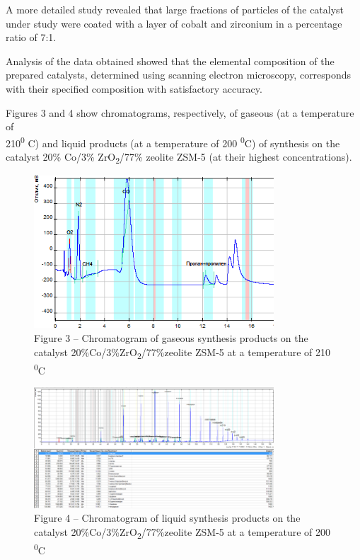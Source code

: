 \begin{multicols}{2}
A more detailed study revealed that large fractions of particles of the
catalyst under study were coated with a layer of cobalt and zirconium in
a percentage ratio of 7:1.

Analysis of the data obtained showed that the elemental composition of
the prepared catalysts, determined using scanning electron microscopy,
corresponds with their specified composition with satisfactory accuracy.

Figures 3 and 4 show chromatograms, respectively, of gaseous (at a
temperature of\\
210\textsuperscript{0} C) and liquid products (at a temperature of 200
\textsuperscript{0}C) of synthesis on the catalyst 20\% Co/3\%
ZrO\textsubscript{2}/77\% zeolite ZSM-5 (at their highest
concentrations).
\end{multicols}

\begin{figure}[H]
	\centering
	\includegraphics[width=0.8\textwidth]{assets/1079}
	\caption*{Figure 3 -- Chromatogram of gaseous synthesis products on the catalyst 20\%Co/3\%ZrO\textsubscript{2}/77\%zeolite ZSM-5 at a temperature of 210 \textsuperscript{0}C}
\end{figure}

\begin{figure}[H]
	\centering
	\includegraphics[width=0.8\textwidth]{assets/1080}
	\caption*{Figure 4 -- Chromatogram of liquid synthesis products on the catalyst 20\%Co/3\%ZrO\textsubscript{2}/77\%zeolite ZSM-5 at a temperature of 200 \textsuperscript{0}C}
\end{figure}

